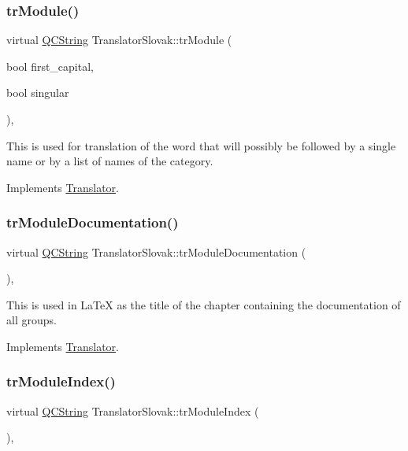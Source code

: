 \subsubsection{\texorpdfstring{trModule()}{trModule()}}
{\footnotesize\ttfamily virtual \mbox{\hyperlink{class_q_c_string}{Q\+C\+String}} Translator\+Slovak\+::tr\+Module (\begin{DoxyParamCaption}\item[{bool}]{first\+\_\+capital,  }\item[{bool}]{singular }\end{DoxyParamCaption})\hspace{0.3cm}{\ttfamily [inline]}, {\ttfamily [virtual]}}

This is used for translation of the word that will possibly be followed by a single name or by a list of names of the category. 

Implements \mbox{\hyperlink{class_translator}{Translator}}.

\mbox{\label{class_translator_slovak_a3ddfe2f41ddafcdbc9d3cce86e22fc31}} 
\subsubsection{\texorpdfstring{trModuleDocumentation()}{trModuleDocumentation()}}
{\footnotesize\ttfamily virtual \mbox{\hyperlink{class_q_c_string}{Q\+C\+String}} Translator\+Slovak\+::tr\+Module\+Documentation (\begin{DoxyParamCaption}{ }\end{DoxyParamCaption})\hspace{0.3cm}{\ttfamily [inline]}, {\ttfamily [virtual]}}

This is used in La\+TeX as the title of the chapter containing the documentation of all groups. 

Implements \mbox{\hyperlink{class_translator}{Translator}}.

\mbox{\label{class_translator_slovak_a99baf933b1b90949314e0ec14d57a319}} 
\subsubsection{\texorpdfstring{trModuleIndex()}{trModuleIndex()}}
{\footnotesize\ttfamily virtual \mbox{\hyperlink{class_q_c_string}{Q\+C\+String}} Translator\+Slovak\+::tr\+Module\+Index (\begin{DoxyParamCaption}{ }\end{DoxyParamCaption})\hspace{0.3cm}{\ttfamily [inline]}, {\ttfamily [virtual]}}

